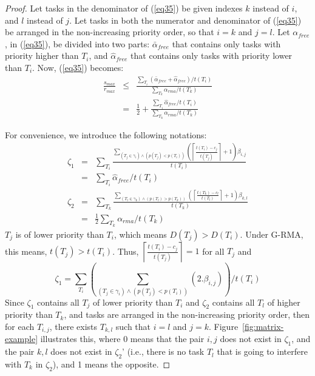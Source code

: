 \documentclass[a4paper,english]{article}
\newtheorem{proof}{Proof}
\begin{document}
\begin{proof}
Let tasks in the denominator of (\ref{eq35}) be given indexes $k$ instead of $i$, and $l$ instead of $j$. Let tasks in both the numerator and denominator of (\ref{eq35}) be arranged in the non-increasing priority order, so that $i=k$ and $j=l$. Let $\alpha_{free}$, in (\ref{eq35}), be divided into two parts: $\bar{\alpha}_{free}$ that contains only tasks with priority higher than $T_i$, and $\hat{\alpha}_{free}$ that contains only tasks with priority lower than $T_i$. Now, (\ref{eq35}) becomes:
\begin{eqnarray}
\frac{s_{max}}{r_{max}} & \le & \frac{\sum_{T_{i}}(\bar{\alpha}_{free}+\hat{\alpha}_{free})/t(T_{i})}{\sum_{T_{k}}\alpha_{rma}/t(T_{k})}\nonumber \\
 & = & \frac{1}{2}+\frac{\sum_{T_{i}}\hat{\alpha}_{free}/t(T_{i})}{\sum_{T_{k}}\alpha_{rma}/t(T_{k})}\label{eq36}\end{eqnarray}

For convenience, we introduce the following notations:
\begin{eqnarray}
\zeta_{1}& = & \sum_{T_{i}}\frac{\sum_{\left(T_{j}\in\gamma_{i}\right)\wedge\left(p\left(T_{j}\right)<p\left(T_{i}\right)\right)}\left(\left\lceil\frac{t\left(T_{i}\right)-c_{j}}{t\left(T_{j}\right)}\right\rceil+1\right)\beta_{i,j}}{t\left(T_{i}\right)}\nonumber\\
& = & \sum_{T_i} \hat{\alpha}_{free}/t(T_i)
\nonumber\\
\zeta_{2} 
& = & \sum_{T_{k}}\frac{\sum_{\left(T_{l}\in\gamma_{k}\right)\wedge\left(p\left(T_{l}\right)>p\left(T_{k}\right)\right)}\left(\left\lceil\frac{t\left(T_{k}\right)-c_{l}}{t\left(T_{l}\right)}\right\rceil+1\right)\beta_{k,l}}{t\left(T_{k}\right)}\nonumber\\
& = & \frac{1}{2}\sum_{T_k} \alpha_{rma}/t(T_k)\nonumber
\end{eqnarray}
$T_{j}$ is of lower priority than $T_{i}$, which means $D(T_{j})>D(T_{i})$. Under G-RMA, this means, $t(T_{j})>t(T_{i})$.
Thus, $\left\lceil\frac{t(T_{i})-c_{j}}{t(T_{j})}\right\rceil=1$ for
all $T_{j}$ and \[\zeta_{1}=\sum_{T_{i}}(\sum_{(T_{j}\in\gamma_{i})\wedge(p(T_{j})<p(T_{i}))}(2.\beta_{i,j}))/t(T_{i})\]
Since $\zeta_{1}$ contains all $T_{j}$ of lower priority than
$T_{i}$ and $\zeta_{2}$ contains all $T_{l}$ of higher priority than $T_{k}$, 
and tasks are arranged in the non-increasing priority order, then for each $T_{i,j}$, there exists $T_{k,l}$ such
that $i=l$ and $j=k$. Figure~\ref{fig:matrix-example} illustrates this, where 0 means that the pair $i,j$ 
does not exist in $\zeta_{1}$,
and the pair $k,l$ does not exist in $\zeta_{2}$' (i.e., 
there is no task $T_l$ that is going to interfere with $T_k$ in $\zeta_2$), 
and 1 means the opposite. 


\end{proof}
\end{document}
